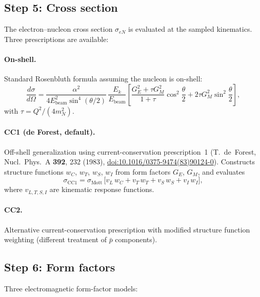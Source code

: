 \documentclass[11pt,a4paper]{article}
\begin{document}
\subsection{Step 5: Cross section}

The electron--nucleon cross section $\sigma_{eN}$ is evaluated at the
sampled kinematics.  Three prescriptions are available:

\paragraph{On-shell.}
Standard Rosenbluth formula assuming the nucleon is on-shell:
\begin{equation}
  \frac{d\sigma}{d\Omega}
  = \frac{\alpha^{2}}{4E_{\text{beam}}^{2}\sin^{4}(\theta/2)}
    \,\frac{E_{k}}{E_{\text{beam}}}
    \left[\frac{G_{E}^{2}+\tau G_{M}^{2}}{1+\tau}\cos^{2}\frac{\theta}{2}
          + 2\tau G_{M}^{2}\sin^{2}\frac{\theta}{2}\right],
\end{equation}
with $\tau = Q^{2}/(4m_{N}^{2})$.

\paragraph{CC1 (de Forest, default).}
Off-shell generalization using current-conservation prescription~1
(T.~de~Forest, Nucl.\ Phys.\ A \textbf{392}, 232 (1983),
\href{https://doi.org/10.1016/0375-9474(83)90124-0}{doi:10.1016/0375-9474(83)90124-0}).
Constructs structure functions $w_{C}$, $w_{T}$, $w_{S}$, $w_{I}$ from
form factors $G_{E}$, $G_{M}$, and evaluates
\begin{equation}
  \sigma_{\text{CC1}} = \sigma_{\text{Mott}}\,
    \bigl[v_{L}\,w_{C} + v_{T}\,w_{T} + v_{S}\,w_{S} + v_{I}\,w_{I}\bigr],
\end{equation}
where $v_{L,T,S,I}$ are kinematic response functions.

\paragraph{CC2.}
Alternative current-conservation prescription with modified structure
function weighting (different treatment of $\bar{p}$ components).

\subsection{Step 6: Form factors}

Three electromagnetic form-factor models:
\end{document}

